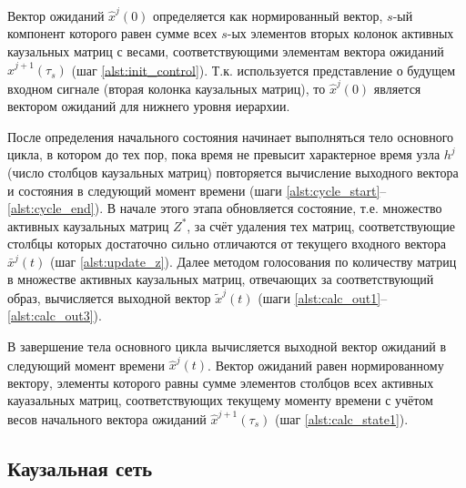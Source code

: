 \documentclass[12pt]{scrartcl}
\begin{document}
	Вектор ожиданий $\hat x^j(0)$ определяется как нормированный вектор, $s$-ый компонент которого равен сумме всех $s$-ых элементов вторых колонок активных каузальных матриц с весами, соответствующими элементам вектора ожиданий $\hat x^{j+1}(\tau_s)$ (шаг \ref{alst:init_control}). Т.к. используется представление о будущем входном сигнале (вторая колонка каузальных матриц), то $\hat x^j(0)$ является вектором ожиданий для нижнего уровня иерархии.

	\linespread{1}
	\begin{algorithm}[H]
		\begin{algorithmic}[1]
			
		\end{algorithmic}
	\end{algorithm}
	\linespread{2}
		
	После определения начального состояния начинает выполняться тело основного цикла, в котором до тех пор, пока время не превысит характерное время узла $h^j$ (число столбцов каузальных матриц) повторяется вычисление выходного вектора и состояния в следующий момент времени (шаги \ref{alst:cycle_start}--\ref{alst:cycle_end}). В начале этого этапа обновляется состояние, т.е. множество активных каузальных матриц $Z^*$, за счёт удаления тех матриц, соответствующие столбцы которых достаточно сильно отличаются от текущего входного вектора $\bar x^j(t)$ (шаг \ref{alst:update_z}). Далее методом голосования по количеству матриц в множестве активных каузальных матриц, отвечающих за соответствующий образ, вычисляется выходной вектор $\tilde x^j(t)$ (шаги \ref{alst:calc_out1}--\ref{alst:calc_out3}).

	В завершение тела основного цикла вычисляется выходной вектор ожиданий в следующий момент времени $\hat x^j(t)$. Вектор ожиданий равен нормированному вектору, элементы которого равны сумме элементов столбцов всех активных кауазальных матриц, соответствующих текущему моменту времени с учётом весов начального вектора ожиданий $\hat x^{j+1}(\tau_s)$ (шаг \ref{alst:calc_state1}).

	\subsection{Каузальная сеть}
	
\end{document}
